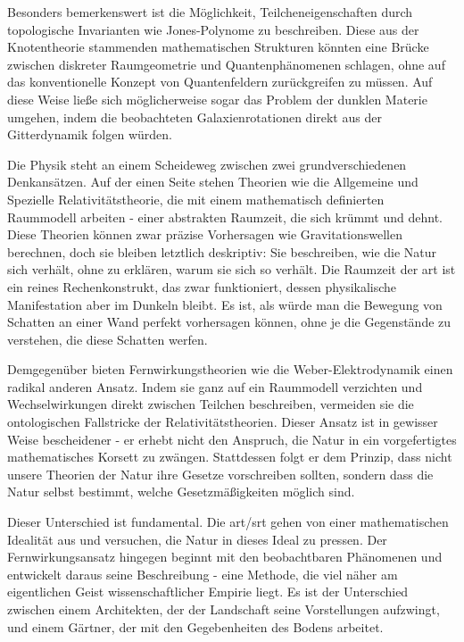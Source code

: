 Besonders bemerkenswert ist die Möglichkeit, Teilcheneigenschaften durch topologische Invarianten wie Jones-Polynome zu beschreiben. Diese aus der Knotentheorie stammenden mathematischen
Strukturen könnten eine Brücke zwischen diskreter Raumgeometrie und Quantenphänomenen schlagen, ohne auf das konventionelle Konzept von Quantenfeldern zurückgreifen zu müssen. Auf diese
Weise ließe sich möglicherweise sogar das Problem der dunklen Materie umgehen, indem die beobachteten Galaxienrotationen direkt aus der Gitterdynamik folgen würden.

Die Physik steht an einem Scheideweg zwischen zwei grundverschiedenen Denkansätzen. Auf der einen Seite stehen Theorien wie die Allgemeine und Spezielle Relativitätstheorie, die mit einem
mathematisch definierten Raummodell arbeiten - einer abstrakten Raumzeit, die sich krümmt und dehnt. Diese Theorien können zwar präzise Vorhersagen wie Gravitationswellen berechnen, doch
sie bleiben letztlich deskriptiv: Sie beschreiben, wie die Natur sich verhält, ohne zu erklären, warum sie sich so verhält. Die Raumzeit der \gls{art} ist ein reines Rechenkonstrukt, das zwar
funktioniert, dessen physikalische Manifestation aber im Dunkeln bleibt. Es ist, als würde man die Bewegung von Schatten an einer Wand perfekt vorhersagen können, ohne je die Gegenstände
zu verstehen, die diese Schatten werfen.

Demgegenüber bieten Fernwirkungstheorien wie die Weber-Elektrodynamik einen radikal anderen Ansatz. Indem sie ganz auf ein Raummodell verzichten und Wechselwirkungen direkt zwischen Teilchen
beschreiben, vermeiden sie die ontologischen Fallstricke der Relativitätstheorien. Dieser Ansatz ist in gewisser Weise bescheidener - er erhebt nicht den Anspruch, die Natur in ein
vorgefertigtes mathematisches Korsett zu zwängen. Stattdessen folgt er dem Prinzip, dass nicht unsere Theorien der Natur ihre Gesetze vorschreiben sollten, sondern dass die Natur selbst
bestimmt, welche Gesetzmäßigkeiten möglich sind.

Dieser Unterschied ist fundamental. Die \gls{art}/\gls{srt} gehen von einer mathematischen Idealität aus und versuchen, die Natur in dieses Ideal zu pressen. Der Fernwirkungsansatz hingegen
beginnt mit den beobachtbaren Phänomenen und entwickelt daraus seine Beschreibung - eine Methode, die viel näher am eigentlichen Geist wissenschaftlicher Empirie liegt. Es ist der Unterschied
zwischen einem Architekten, der der Landschaft seine Vorstellungen aufzwingt, und einem Gärtner, der mit den Gegebenheiten des Bodens arbeitet.

